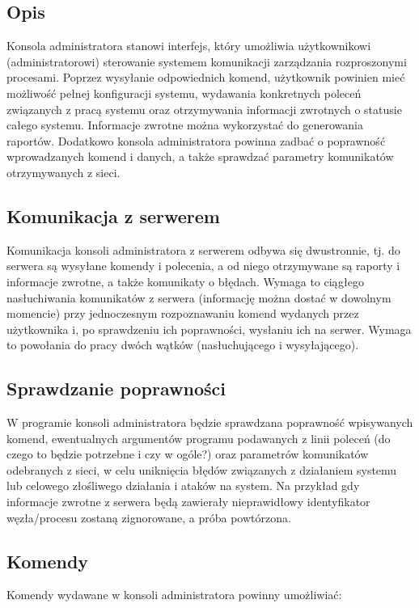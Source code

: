 \documentclass[10pt,a4paper]{article}
\begin{document}
		\subsection{Opis}
			Konsola administratora stanowi interfejs, który umożliwia użytkownikowi (administratorowi)  sterowanie systemem komunikacji zarządzania rozproszonymi procesami. Poprzez wysyłanie odpowiednich komend, użytkownik powinien mieć możliwość pełnej konfiguracji systemu, wydawania konkretnych poleceń związanych z pracą systemu oraz otrzymywania informacji zwrotnych o statusie całego systemu. Informacje zwrotne można wykorzystać do generowania raportów. Dodatkowo konsola administratora powinna zadbać o poprawność wprowadzanych komend i danych, a także sprawdzać parametry komunikatów otrzymywanych z sieci.
		
		\subsection{Komunikacja z serwerem}
			Komunikacja konsoli administratora z serwerem odbywa się dwustronnie, tj. do serwera są wysyłane komendy i polecenia, a od niego otrzymywane są raporty i informacje zwrotne, a także komunikaty o błędach. Wymaga to ciągłego nasłuchiwania komunikatów z serwera (informację można dostać w dowolnym momencie) przy jednoczesnym rozpoznawaniu komend wydanych przez użytkownika i, po sprawdzeniu ich poprawności, wysłaniu ich na serwer. Wymaga to powołania do pracy dwóch wątków (nasłuchującego i wysyłającego).
		
		\subsection{Sprawdzanie poprawności}
			W programie konsoli administratora będzie sprawdzana poprawność wpisywanych komend, ewentualnych argumentów programu podawanych z linii poleceń (do czego to będzie potrzebne i czy w ogóle?) oraz parametrów komunikatów odebranych z sieci, w celu uniknięcia błędów związanych z działaniem systemu lub celowego złośliwego działania i ataków na system. Na przykład gdy informacje zwrotne z serwera będą zawierały nieprawidłowy identyfikator węzła/procesu zostaną zignorowane, a próba powtórzona.
		
		\subsection{Komendy}
			Komendy wydawane w konsoli administratora powinny umożliwiać:
			
\end{document}
